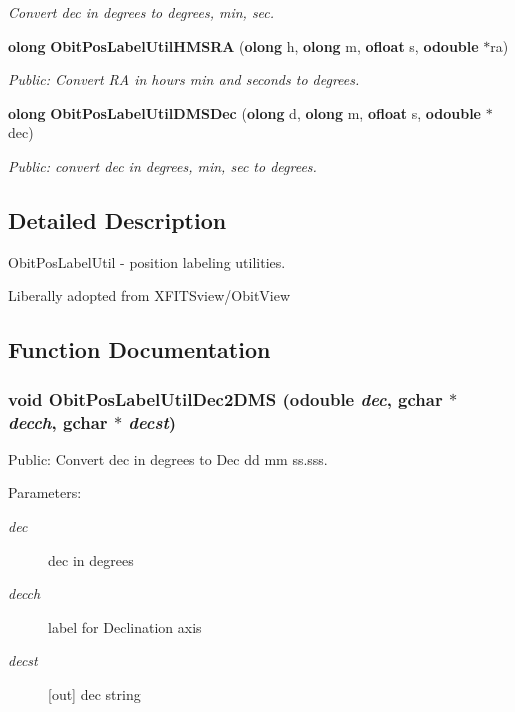 \begin{CompactItemize}
\begin{CompactList}\small\item\em Convert dec in degrees to degrees, min, sec. \item\end{CompactList}\item 
{\bf olong} {\bf Obit\-Pos\-Label\-Util\-HMSRA} ({\bf olong} h, {\bf olong} m, {\bf ofloat} s, {\bf odouble} $\ast$ra)
\begin{CompactList}\small\item\em Public: Convert RA in hours min and seconds to degrees. \item\end{CompactList}\item 
{\bf olong} {\bf Obit\-Pos\-Label\-Util\-DMSDec} ({\bf olong} d, {\bf olong} m, {\bf ofloat} s, {\bf odouble} $\ast$dec)
\begin{CompactList}\small\item\em Public: convert dec in degrees, min, sec to degrees. \item\end{CompactList}\end{CompactItemize}


\subsection{Detailed Description}
Obit\-Pos\-Label\-Util - position labeling utilities. 

Liberally adopted from XFITSview/Obit\-View

\subsection{Function Documentation}
\subsubsection{\setlength{\rightskip}{0pt plus 5cm}void Obit\-Pos\-Label\-Util\-Dec2DMS ({\bf odouble} {\em dec}, gchar $\ast$ {\em decch}, gchar $\ast$ {\em decst})}\label{ObitPosLabelUtil_8c_a2}


Public: Convert dec in degrees to Dec dd mm ss.sss. 

\begin{Desc}
\item[Parameters:]
\begin{description}
\item[{\em dec}]dec in degrees \item[{\em decch}]label for Declination axis \item[{\em decst}][out] dec string \end{description}
\end{Desc}
